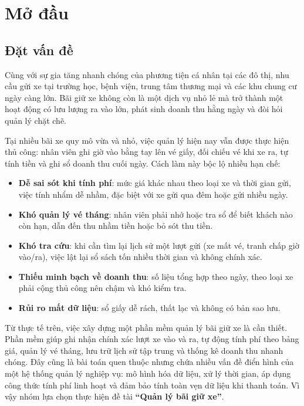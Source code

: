 \chapter{Mở đầu}
\section{Đặt vấn đề}

Cùng với sự gia tăng nhanh chóng của phương tiện cá nhân tại các đô thị, nhu cầu gửi xe tại trường học, bệnh viện, trung tâm thương mại và các khu chung cư ngày càng lớn. Bãi giữ xe không còn là một dịch vụ nhỏ lẻ mà trở thành một hoạt động có lưu lượng ra vào lớn, phát sinh doanh thu hằng ngày và đòi hỏi quản lý chặt chẽ.

Tại nhiều bãi xe quy mô vừa và nhỏ, việc quản lý hiện nay vẫn được thực hiện thủ công: nhân viên ghi giờ vào bằng tay lên vé giấy, đối chiếu vé khi xe ra, tự tính tiền và ghi sổ doanh thu cuối ngày. Cách làm này bộc lộ nhiều hạn chế:

\begin{itemize}
  \item \textbf{Dễ sai sót khi tính phí}: mức giá khác nhau theo loại xe và thời gian gửi, việc tính nhẩm dễ nhầm, đặc biệt với xe gửi qua đêm hoặc gửi nhiều ngày.
  \item \textbf{Khó quản lý vé tháng}: nhân viên phải nhớ hoặc tra sổ để biết khách nào còn hạn, dẫn đến thu nhầm tiền hoặc bỏ sót thu tiền.
  \item \textbf{Khó tra cứu}: khi cần tìm lại lịch sử một lượt gửi (xe mất vé, tranh chấp giờ vào/ra), việc lật lại sổ sách tốn nhiều thời gian và không chính xác.
  \item \textbf{Thiếu minh bạch về doanh thu}: số liệu tổng hợp theo ngày, theo loại xe phải cộng thủ công nên chậm và khó kiểm tra.
  \item \textbf{Rủi ro mất dữ liệu}: sổ giấy dễ rách, thất lạc và không có bản sao lưu.
\end{itemize}

Từ thực tế trên, việc xây dựng một phần mềm quản lý bãi giữ xe là cần thiết. Phần mềm giúp ghi nhận chính xác lượt xe vào và ra, tự động tính phí theo bảng giá, quản lý vé tháng, lưu trữ lịch sử tập trung và thống kê doanh thu nhanh chóng. Đây cũng là bài toán quen thuộc nhưng chứa nhiều vấn đề điển hình của một hệ thống quản lý nghiệp vụ: mô hình hóa dữ liệu, xử lý thời gian, áp dụng công thức tính phí linh hoạt và đảm bảo tính toàn vẹn dữ liệu khi thanh toán. Vì vậy nhóm lựa chọn thực hiện đề tài \textbf{``Quản lý bãi giữ xe''}.

